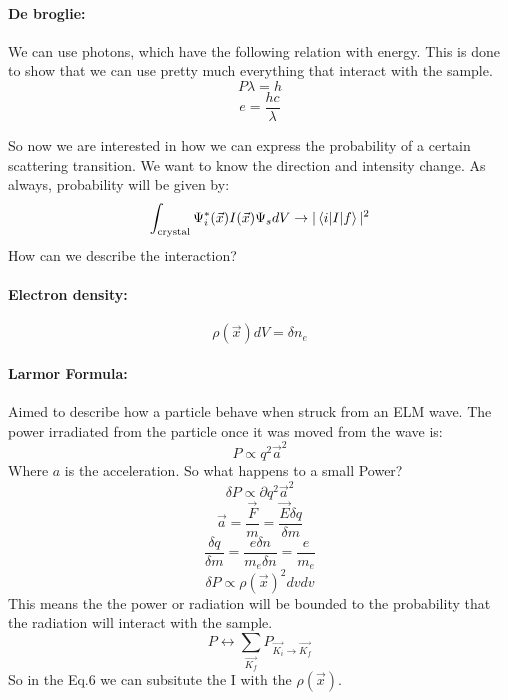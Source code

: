\paragraph{De broglie:} We can use photons, which have the following relation with energy. This is done to show that we can use pretty much everything that interact with the sample.
\begin{equation}
    P\lambda = h
\end{equation}
\begin{equation}
    e = \frac{hc}{\lambda}
\end{equation}

\noindent So now we are interested in how we can express the probability of a certain scattering transition. We want to know the direction and intensity change. As always, probability will be given by:
\begin{equation}
    \int_{\text{crystal}} \Psi_i^*(\vec{x}) I(\vec{x}) \Psi_s dV \rightarrow |\braket{i|I|f}|^2
\end{equation}
How can we describe the interaction?

\paragraph{Electron density:}
\begin{equation}
    \rho(\vec{x})dV = \delta n_e
\end{equation}

\paragraph{Larmor Formula:} Aimed to describe how a particle behave when struck from an ELM wave. The power irradiated from the particle once it was moved from the wave is:
\begin{equation}
    P \propto q^2\vec{a}^2
\end{equation}
Where $a$ is the acceleration. So what happens to a small Power?
\begin{equation}
    \delta P \propto \partial q^2 \vec{a}^2
\end{equation}
\begin{equation}
    \vec{a} = \frac{\vec{F}}{m} = \frac{\vec{E} \delta q}{\delta m}
\end{equation}
\begin{equation}
    \frac{\delta q}{\delta m} = \frac{e\delta n}{m_e \delta n} = \frac{e}{m_e}
\end{equation}
\begin{equation}
    \delta P \propto \rho(\vec{x})^2 dv dv
\end{equation}
This means the the power or radiation will be bounded to the probability that the radiation will interact with the sample.
\begin{equation}
    P \leftrightarrow \sum_{\vec{K_f}}P_{\vec{K_i} \rightarrow \vec{K_f}}
\end{equation}
So in the Eq.6 we can subsitute the I with the $\rho(\vec{x})$.

